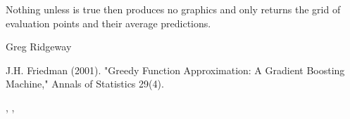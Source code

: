 \documentclass{article}
\begin{document}
\begin{Value}
Nothing unless  is true then  produces no
graphics and only returns the grid of evaluation points and their average
predictions.
\end{Value}
\begin{Author}\relax
Greg Ridgeway 
\end{Author}
\begin{References}\relax
J.H. Friedman (2001). "Greedy Function Approximation: A Gradient Boosting
Machine," Annals of Statistics 29(4).
\end{References}
\begin{SeeAlso}\relax
{}, , 
\end{SeeAlso}
\end{document}
